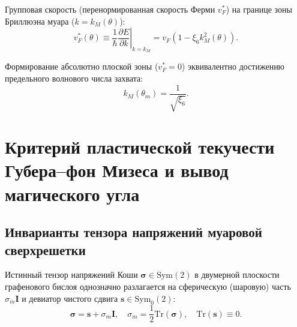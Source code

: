 \documentclass[12pt,a4paper]{article}
\begin{document}
	Групповая скорость (перенормированная скорость Ферми $v_F^*$) на границе зоны Бриллюэна муара ($k = k_M(\theta)$):
	\begin{equation}
		v_F^*(\theta) \equiv \frac{1}{\hbar} \left. \frac{\partial E}{\partial k} \right|_{k=k_M} = v_F \left( 1 - \xi_6 k_M^2(\theta) \right).
	\end{equation}
	
	Формирование абсолютно плоской зоны ($v_F^* = 0$) эквивалентно достижению предельного волнового числа захвата:
	\begin{equation}
		k_M(\theta_m) = \frac{1}{\sqrt{\xi_6}}.
	\end{equation}
	
	\section{Критерий пластической текучести Губера--фон Мизеса и вывод магического угла}
	
	\subsection{Инварианты тензора напряжений муаровой сверхрешетки}
	Истинный тензор напряжений Коши $\boldsymbol{\sigma} \in \mathrm{Sym}(2)$ в двумерной плоскости графенового бислоя однозначно разлагается на сферическую (шаровую) часть $\sigma_m \mathbf{I}$ и девиатор чистого сдвига $\mathbf{s} \in \mathrm{Sym}_0(2)$:
	\begin{equation}
		\boldsymbol{\sigma} = \mathbf{s} + \sigma_m \mathbf{I}, \quad \sigma_m = \frac{1}{2} \mathrm{Tr}(\boldsymbol{\sigma}), \quad \mathrm{Tr}(\mathbf{s}) \equiv 0.
	\end{equation}
	
\end{document}
